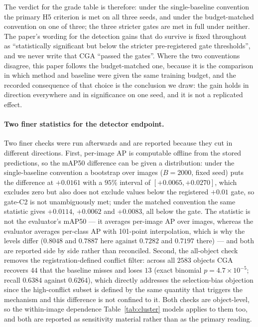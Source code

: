 \documentclass[pdflatex,sn-mathphys-num]{sn-jnl}
\theoremstyle{thmstyleone}%
\theoremstyle{thmstyletwo}%
\theoremstyle{thmstylethree}%
\begin{document}
The verdict for the grade table is therefore: under the single-baseline convention the primary H5 criterion is met on all three seeds, and under the budget-matched convention on one of three; the three stricter gates are met in full under neither. The paper's wording for the detection gains that do survive is fixed throughout as ``statistically significant but below the stricter pre-registered gate thresholds'', and we never write that CGA ``passed the gates''. Where the two conventions disagree, this paper follows the budget-matched one, because it is the comparison in which method and baseline were given the same training budget, and the recorded consequence of that choice is the conclusion we draw: the gain holds in direction everywhere and in significance on one seed, and it is not a replicated effect.

\paragraph{Two finer statistics for the detector endpoint.} Two finer checks were run afterwards and are reported because they cut in different directions. First, per-image AP is computable offline from the stored predictions, so the mAP50 difference can be given a distribution: under the single-baseline convention a bootstrap over images ($B=2000$, fixed seed) puts the difference at $+0.0161$ with a $95\%$ interval of $[+0.0065,+0.0270]$, which excludes zero but also does not exclude values below the registered $+0.01$ gate, so gate-C2 is not unambiguously met; under the matched convention the same statistic gives $+0.0114$, $+0.0062$ and $+0.0083$, all below the gate. The statistic is not the evaluator's mAP50 --- it averages per-image AP over images, whereas the evaluator averages per-class AP with 101-point interpolation, which is why the levels differ ($0.8048$ and $0.7887$ here against $0.7282$ and $0.7197$ there) --- and both are reported side by side rather than reconciled. Second, the all-object check removes the registration-defined conflict filter: across all $2583$ objects CGA recovers $44$ that the baseline misses and loses $13$ (exact binomial $p = 4.7\times10^{-5}$; recall $0.6384$ against $0.6264$), which directly addresses the selection-bias objection since the high-conflict subset is defined by the same quantity that triggers the mechanism and this difference is not confined to it. Both checks are object-level, so the within-image dependence Table~\ref{tab:cluster} models applies to them too, and both are reported as sensitivity material rather than as the primary reading.
\end{document}
